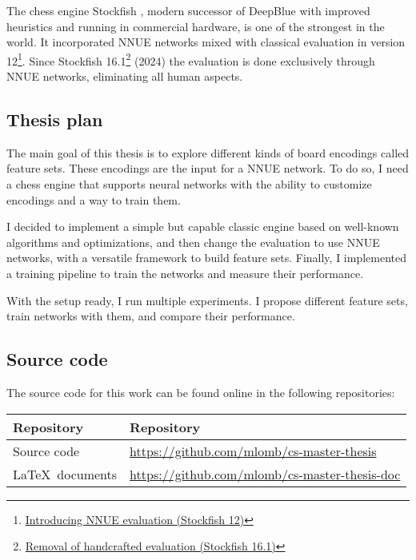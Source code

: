 The chess engine Stockfish \cite{stockfish}, modern successor of DeepBlue with improved heuristics and running in commercial hardware, is one of the strongest in the world. It incorporated NNUE networks mixed with classical evaluation in version 12\footnote[1]{\href{https://stockfishchess.org/blog/2020/introducing-nnue-evaluation/}{Introducing NNUE evaluation (Stockfish 12)}}. Since Stockfish 16.1\footnote[2]{\href{https://stockfishchess.org/blog/2024/stockfish-16-1/}{Removal of handcrafted evaluation (Stockfish 16.1)}} (2024) the evaluation is done exclusively through NNUE networks, eliminating all human aspects.

\newpage
\subsection{Thesis plan}

The main goal of this thesis is to explore different kinds of board encodings called feature sets. These encodings are the input for a NNUE network. To do so, I need a chess engine that supports neural networks with the ability to customize encodings and a way to train them.

I decided to implement a simple but capable classic engine based on well-known algorithms and optimizations, and then change the evaluation to use NNUE networks, with a versatile framework to build feature sets. Finally, I implemented a training pipeline to train the networks and measure their performance.

With the setup ready, I run multiple experiments. I propose different feature sets, train networks with them, and compare their performance.

\subsection{Source code}

The source code for this work can be found online in the following repositories:

\begin{table}[H]
\centering
\begin{tabular}{ll}
\toprule
\textbf{Repository} & \textbf{Repository} \\
\midrule
Source code & \url{https://github.com/mlomb/cs-master-thesis} \\
\LaTeX\ documents & \url{https://github.com/mlomb/cs-master-thesis-doc}
\end{tabular}
\end{table}
